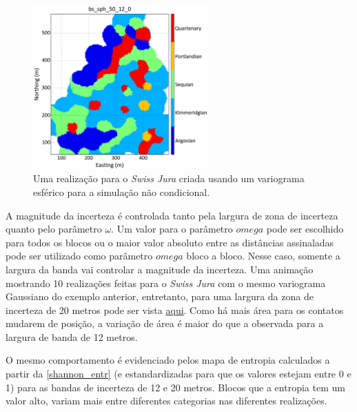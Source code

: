 \begin{figure}[H]
	\caption{\label{sph_jura} Uma realização para o \textit{Swiss Jura} criada usando um variograma esférico para a simulação não condicional.}
	\centering
		\includegraphics[width=0.6\textwidth]{capitulo_3/imagens/sph_real_0_50_12.png}
\end{figure}

A magnitude da incerteza é controlada tanto pela largura de zona de incerteza quanto pelo parâmetro $\omega$. Um valor para o parâmetro $omega$ pode ser escolhido para todos os blocos ou o maior valor absoluto entre as distâncias assinaladas pode ser utilizado como parâmetro $omega$ bloco a bloco. Nesse caso, somente a largura da banda vai controlar a magnitude da incerteza. Uma animação mostrando 10 realizações feitas para o \textit{Swiss Jura} com o mesmo variograma Gaussiano do exemplo anterior, entretanto, para uma largura da zona de incerteza de 20 metros pode ser vista \href{https://github.com/robertorolo/assessing_geological_model_uncertainty_with_probability_fields/blob/main/ezgif-2-721b458d5c70.gif}{aqui}. Como há mais área para os contatos mudarem de posição, a variação de área é maior do que a observada para a largura de banda de 12 metros. 

O mesmo comportamento é evidenciado pelos mapa de entropia calculados a partir da \autoref{shannon_entr} (e estandardizadas para que os valores estejam entre 0 e 1) para as bandas de incerteza de 12 e 20 metros. Blocos que a entropia tem um valor alto, variam mais entre diferentes categorias nas diferentes realizações. 

